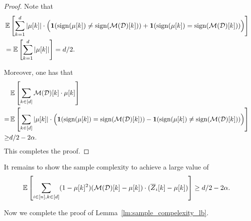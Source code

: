 \begin{proof}
Note that
\begin{align*}
    &\operatorname*{\mathbb{E}}\left[\sum_{k=1}^{d}|\mu[k]|\cdot \Big(\mathbf{1}(\operatorname{sign}(\mu[k])\neq\operatorname{sign}(\mathcal{M}(\mathcal{D})[k])) + \mathbf{1}(\operatorname{sign}(\mu[k])=\operatorname{sign}(\mathcal{M}(\mathcal{D})[k]) )\Big)\right] \\
    &=\operatorname*{\mathbb{E}}\left[\sum_{k=1}^d|\mu[k]|\right]=d/2.
\end{align*}

Moreover, one has that
\begin{align*}
    &\operatorname*{\mathbb{E}}\left[ \sum_{k\in[d]}\mathcal{M}(\mathcal{D})[k]\cdot\mu[k] \right]\\
    =& \operatorname*{\mathbb{E}}\left[\sum_{k\in[d]}|\mu[k]|\cdot \Big(\mathbf{1}(\operatorname{sign}(\mu[k])=\operatorname{sign}(\mathcal{M}(\mathcal{D})[k]))-\mathbf{1}(\operatorname{sign}(\mu[k])\neq \operatorname{sign}(\mathcal{M}(\mathcal{D})[k]))\Big)\right]\\
    \ge& d/2-2\alpha.
\end{align*}
This completes the proof.
\end{proof}

It remains to show the sample complexity to achieve a large value of 
\begin{align}
\label{eq:large_correlation}
\operatorname*{\mathbb{E}}\left[\sum_{i\in[n],k\in[d]} (1-\mu[k]^2) (\mathcal{M}(\mathcal{D})[k]-\mu[k])\cdot(\overline{Z}_i[k]-\mu[k])\right]\ge d/2-2\alpha.    
\end{align}


Now we complete the proof of Lemma~\ref{lm:sample_compelexity_lb}.

